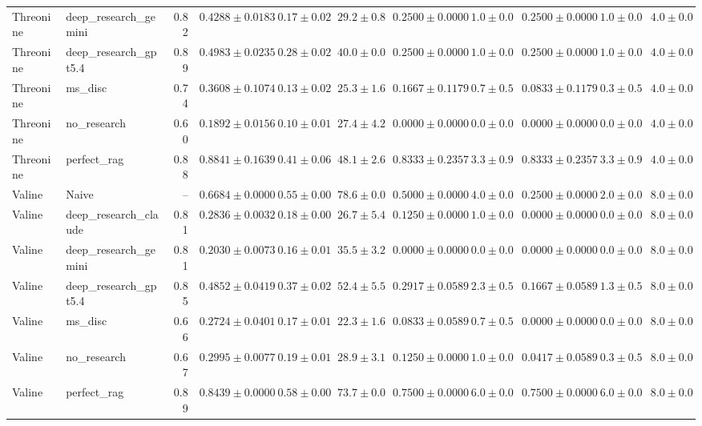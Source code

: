 \begin{table}[htbp]
\begin{tabular}{llrrrrrrrrr}
Threonine & deep_research_gemini & 0.82 & $0.4288 \pm 0.0183$ & $0.17 \pm 0.02$ & $29.2 \pm 0.8$ & $0.2500 \pm 0.0000$ & $1.0 \pm 0.0$ & $0.2500 \pm 0.0000$ & $1.0 \pm 0.0$ & $4.0 \pm 0.0$ \\
Threonine & deep_research_gpt5.4 & 0.89 & $0.4983 \pm 0.0235$ & $0.28 \pm 0.02$ & $40.0 \pm 0.0$ & $0.2500 \pm 0.0000$ & $1.0 \pm 0.0$ & $0.2500 \pm 0.0000$ & $1.0 \pm 0.0$ & $4.0 \pm 0.0$ \\
Threonine & ms_disc & 0.74 & $0.3608 \pm 0.1074$ & $0.13 \pm 0.02$ & $25.3 \pm 1.6$ & $0.1667 \pm 0.1179$ & $0.7 \pm 0.5$ & $0.0833 \pm 0.1179$ & $0.3 \pm 0.5$ & $4.0 \pm 0.0$ \\
Threonine & no_research & 0.60 & $0.1892 \pm 0.0156$ & $0.10 \pm 0.01$ & $27.4 \pm 4.2$ & $0.0000 \pm 0.0000$ & $0.0 \pm 0.0$ & $0.0000 \pm 0.0000$ & $0.0 \pm 0.0$ & $4.0 \pm 0.0$ \\
Threonine & perfect_rag & 0.88 & \cellcolor{green!25}$0.8841 \pm 0.1639$ & $0.41 \pm 0.06$ & $48.1 \pm 2.6$ & $0.8333 \pm 0.2357$ & $3.3 \pm 0.9$ & $0.8333 \pm 0.2357$ & $3.3 \pm 0.9$ & $4.0 \pm 0.0$ \\
\midrule
Valine & Naive & -- & $0.6684 \pm 0.0000$ & $0.55 \pm 0.00$ & $78.6 \pm 0.0$ & $0.5000 \pm 0.0000$ & $4.0 \pm 0.0$ & $0.2500 \pm 0.0000$ & $2.0 \pm 0.0$ & $8.0 \pm 0.0$ \\
Valine & deep_research_claude & 0.81 & $0.2836 \pm 0.0032$ & $0.18 \pm 0.00$ & $26.7 \pm 5.4$ & $0.1250 \pm 0.0000$ & $1.0 \pm 0.0$ & $0.0000 \pm 0.0000$ & $0.0 \pm 0.0$ & $8.0 \pm 0.0$ \\
Valine & deep_research_gemini & 0.81 & \cellcolor{red!25}$0.2030 \pm 0.0073$ & $0.16 \pm 0.01$ & $35.5 \pm 3.2$ & $0.0000 \pm 0.0000$ & $0.0 \pm 0.0$ & $0.0000 \pm 0.0000$ & $0.0 \pm 0.0$ & $8.0 \pm 0.0$ \\
Valine & deep_research_gpt5.4 & 0.85 & $0.4852 \pm 0.0419$ & $0.37 \pm 0.02$ & $52.4 \pm 5.5$ & $0.2917 \pm 0.0589$ & $2.3 \pm 0.5$ & $0.1667 \pm 0.0589$ & $1.3 \pm 0.5$ & $8.0 \pm 0.0$ \\
Valine & ms_disc & 0.66 & $0.2724 \pm 0.0401$ & $0.17 \pm 0.01$ & $22.3 \pm 1.6$ & $0.0833 \pm 0.0589$ & $0.7 \pm 0.5$ & $0.0000 \pm 0.0000$ & $0.0 \pm 0.0$ & $8.0 \pm 0.0$ \\
Valine & no_research & 0.67 & $0.2995 \pm 0.0077$ & $0.19 \pm 0.01$ & $28.9 \pm 3.1$ & $0.1250 \pm 0.0000$ & $1.0 \pm 0.0$ & $0.0417 \pm 0.0589$ & $0.3 \pm 0.5$ & $8.0 \pm 0.0$ \\
Valine & perfect_rag & 0.89 & \cellcolor{green!25}$0.8439 \pm 0.0000$ & $0.58 \pm 0.00$ & $73.7 \pm 0.0$ & $0.7500 \pm 0.0000$ & $6.0 \pm 0.0$ & $0.7500 \pm 0.0000$ & $6.0 \pm 0.0$ & $8.0 \pm 0.0$ \\
\bottomrule
\end{tabular}
\end{table}